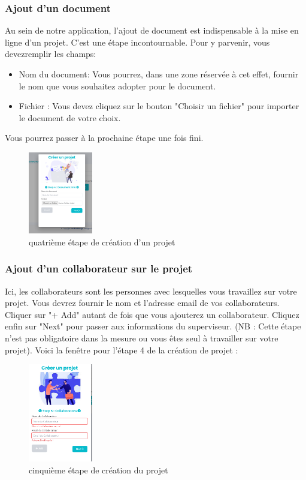 \documentclass[12pt]{article}
\begin{document}
\medskip
\subsubsection{Ajout d'un document}
Au sein de notre application, l'ajout de document est indispensable à la mise en ligne d'un projet. C'est une étape incontournable. Pour y parvenir, vous devezremplir les champs:
\begin{itemize}
    \item Nom du document: Vous pourrez, dans une zone réservée  à cet effet, fournir le nom que vous souhaitez adopter pour le document.
    \item Fichier : Vous devez cliquez sur le bouton "Choisir un fichier" pour importer le document de votre choix.
\end{itemize} 
Vous pourrez passer à la prochaine étape une fois fini.    

\begin{figure}[h!]
    \centering
    \includegraphics[width=0.25\textwidth]{./images/step4-create-project.png}
    \caption{quatrième étape de création d'un projet}
    \label{fig:quatrième étape de création du projet}
\end{figure}

\medskip
\subsubsection{Ajout d'un collaborateur sur le projet}
Ici, les collaborateurs sont les personnes avec lesquelles vous travaillez sur votre projet. Vous devrez fournir le nom et l'adresse email de vos collaborateurs. Cliquer sur "+ Add" autant de fois que vous ajouterez un collaborateur. Cliquez enfin sur "Next" pour passer aux informations du superviseur.
(NB : Cette étape n’est pas obligatoire dans la mesure ou vous êtes seul à travailler sur votre projet). Voici la fenêtre pour l'étape 4 de la création de projet :

\begin{figure}[h!]
\centering
\includegraphics[width=0.25\textwidth]{images/etape5-projet.png}
\caption{cinquième étape de création du projet}
\label{fig:etape5projet}
\end{figure}
\end{document}

